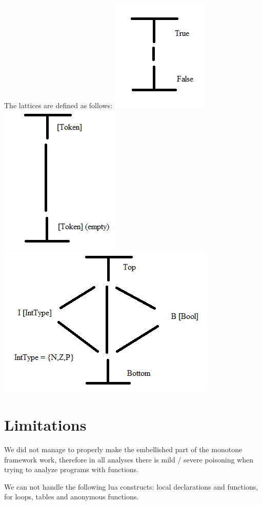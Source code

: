\documentclass[10pt]{article}
\begin{document}
The lattices are defined as follows: %
\includegraphics[scale=0.5]{latticeReach.png}
\includegraphics[scale=0.5]{latticeLive.png}
\includegraphics[scale=0.5]{latticeSign.png}

\section{Limitations}
We did not manage to properly make the embellished part of the monotone framework work, therefore in all analyses there is mild / severe poisoning when trying to analyze programs with functions.

We can not handle the following lua constructs: local declarations and functions, for loops, tables and anonymous functions.
\end{document}
